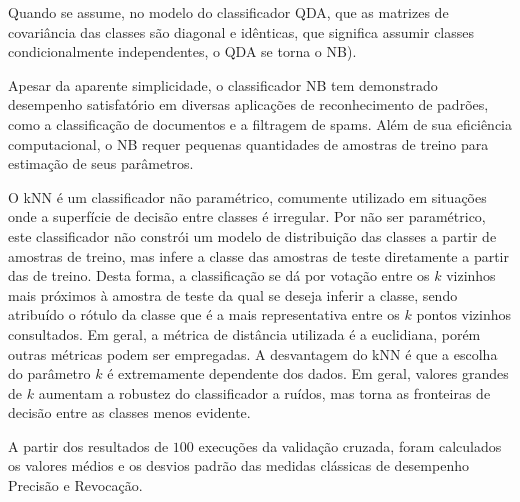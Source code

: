 Quando se assume, no modelo do classificador \ac{QDA}, que as matrizes de covariância das classes são diagonal e idênticas, que significa assumir classes condicionalmente independentes, o \ac{QDA} se torna o \ac{NB}). 

Apesar da aparente simplicidade, o classificador \ac{NB} tem demonstrado desempenho satisfatório em diversas aplicações de reconhecimento de padrões, como a classificação de documentos e a filtragem de spams. Além de sua eficiência computacional, o \ac{NB} requer pequenas quantidades de amostras de treino para estimação de seus parâmetros.

O \ac{kNN} é um classificador não paramétrico, comumente utilizado em situações onde a superfície de decisão entre classes é irregular. Por não ser paramétrico, este classificador não constrói um modelo de distribuição das classes a partir de amostras de treino, mas infere a classe das amostras de teste diretamente a partir das de treino. Desta forma, a classificação se dá por votação entre os $k$ vizinhos mais próximos à amostra de teste da qual se deseja inferir a classe, sendo atribuído o rótulo da classe que é a mais representativa entre os $k$ pontos vizinhos consultados. Em geral, a métrica de distância utilizada é a euclidiana, porém outras métricas podem ser empregadas. A desvantagem do \ac{kNN} é que a escolha do parâmetro $k$ é extremamente dependente dos dados. Em geral, valores grandes de $k$ aumentam a robustez do classificador a ruídos, mas torna as fronteiras de decisão entre as classes menos evidente.

A partir dos resultados de $100$ execuções da validação cruzada, foram calculados os valores médios e os desvios padrão das medidas clássicas de desempenho Precisão e Revocação.







